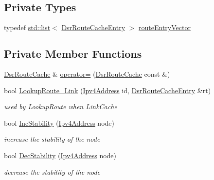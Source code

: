 \subsection*{Private Types}
\begin{DoxyCompactItemize}
\item 
typedef \hyperlink{openflow-interface_8h_afd9bcfa176617760671b67580f536fa7}{std\+::list}$<$ \hyperlink{classns3_1_1dsr_1_1DsrRouteCacheEntry}{Dsr\+Route\+Cache\+Entry} $>$ \hyperlink{classns3_1_1dsr_1_1DsrRouteCache_a21c35649779d4e4c85b8e128dbcc0971}{route\+Entry\+Vector}
\end{DoxyCompactItemize}
\subsection*{Private Member Functions}
\begin{DoxyCompactItemize}
\item 
\hyperlink{classns3_1_1dsr_1_1DsrRouteCache}{Dsr\+Route\+Cache} \& \hyperlink{classns3_1_1dsr_1_1DsrRouteCache_a62f4b1c216987d53a951402cb8de0362}{operator=} (\hyperlink{classns3_1_1dsr_1_1DsrRouteCache}{Dsr\+Route\+Cache} const \&)
\item 
bool \hyperlink{classns3_1_1dsr_1_1DsrRouteCache_ac9fcf2d3676a0e05cd567988cb29fe5a}{Lookup\+Route\+\_\+\+Link} (\hyperlink{classns3_1_1Ipv4Address}{Ipv4\+Address} id, \hyperlink{classns3_1_1dsr_1_1DsrRouteCacheEntry}{Dsr\+Route\+Cache\+Entry} \&rt)
\begin{DoxyCompactList}\small\item\em used by Lookup\+Route when Link\+Cache \end{DoxyCompactList}\item 
bool \hyperlink{classns3_1_1dsr_1_1DsrRouteCache_aa638a140150404cc82a5937bcc622395}{Inc\+Stability} (\hyperlink{classns3_1_1Ipv4Address}{Ipv4\+Address} node)
\begin{DoxyCompactList}\small\item\em increase the stability of the node \end{DoxyCompactList}\item 
bool \hyperlink{classns3_1_1dsr_1_1DsrRouteCache_af32b977b15a417429c72f2fdf4bcd920}{Dec\+Stability} (\hyperlink{classns3_1_1Ipv4Address}{Ipv4\+Address} node)
\begin{DoxyCompactList}\small\item\em decrease the stability of the node \end{DoxyCompactList}\end{DoxyCompactItemize}
